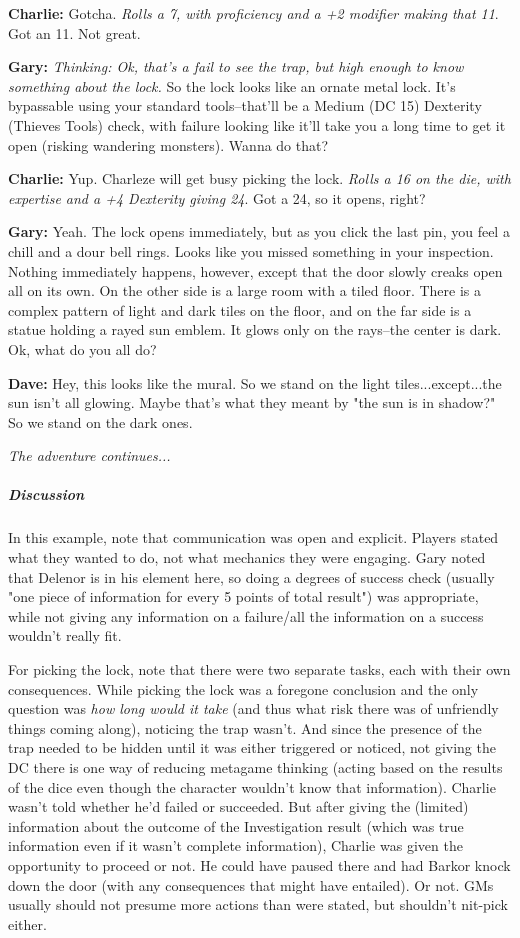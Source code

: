 \textbf{Charlie:} Gotcha. \textit{Rolls a 7, with proficiency and a +2 modifier making that 11}. Got an 11. Not great.

\textbf{Gary:} \textit{Thinking: Ok, that's a fail to see the trap, but high enough to know something about the lock.} So the lock looks like an ornate metal lock. It's bypassable using your standard tools--that'll be a Medium (DC 15) Dexterity (Thieves Tools) check, with failure looking like it'll take you a long time to get it open (risking wandering monsters). Wanna do that?

\textbf{Charlie:} Yup. Charleze will get busy picking the lock. \textit{Rolls a 16 on the die, with expertise and a +4 Dexterity giving 24}. Got a 24, so it opens, right?

\textbf{Gary:} Yeah. The lock opens immediately, but as you click the last pin, you feel a chill and a dour bell rings. Looks like you missed something in your inspection. Nothing immediately happens, however, except that the door slowly creaks open all on its own. On the other side is a large room with a tiled floor. There is a complex pattern of light and dark tiles on the floor, and on the far side is a statue holding a rayed sun emblem. It glows only on the rays--the center is dark. Ok, what do you all do?

\textbf{Dave:} Hey, this looks like the mural. So we stand on the light tiles...except...the sun isn't all glowing. Maybe that's what they meant by "the sun is in shadow?" So we stand on the dark ones.

\textit{The adventure continues...}

\subparagraph*{Discussion}
In this example, note that communication was open and explicit. Players stated what they wanted to do, not what mechanics they were engaging. Gary noted that Delenor is in his element here, so doing a degrees of success check (usually "one piece of information for every 5 points of total result") was appropriate, while not giving any information on a failure/all the information on a success wouldn't really fit.

For picking the lock, note that there were two separate tasks, each with their own consequences. While picking the lock was a foregone conclusion and the only question was \textit{how long would it take} (and thus what risk there was of unfriendly things coming along), noticing the trap wasn't. And since the presence of the trap needed to be hidden until it was either triggered or noticed, not giving the DC there is one way of reducing metagame thinking (acting based on the results of the dice even though the character wouldn't know that information). Charlie wasn't told whether he'd failed or succeeded. But after giving the (limited) information about the outcome of the Investigation result (which was true information even if it wasn't complete information), Charlie was given the opportunity to proceed or not. He could have paused there and had Barkor knock down the door (with any consequences that might have entailed). Or not. GMs usually should not presume more actions than were stated, but shouldn't nit-pick either.

